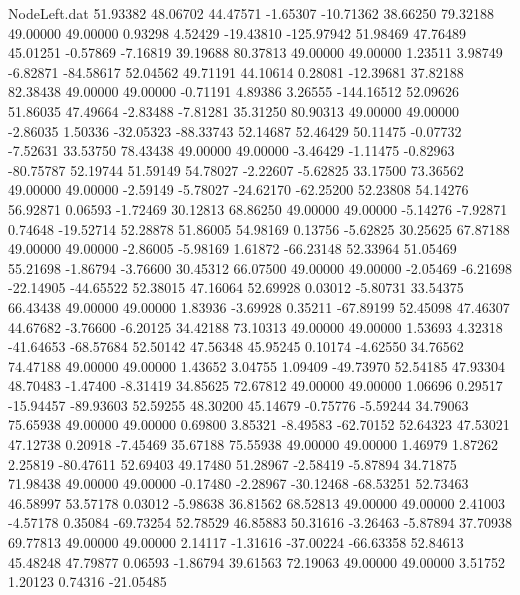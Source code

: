 \begin{filecontents}{NodeLeft.dat}
  51.93382   48.06702   44.47571    -1.65307  -10.71362   38.66250   79.32188   49.00000   49.00000    0.93298    4.52429  -19.43810 -125.97942
  51.98469   47.76489   45.01251    -0.57869   -7.16819   39.19688   80.37813   49.00000   49.00000    1.23511    3.98749   -6.82871  -84.58617
  52.04562   49.71191   44.10614     0.28081  -12.39681   37.82188   82.38438   49.00000   49.00000   -0.71191    4.89386    3.26555 -144.16512
  52.09626   51.86035   47.49664    -2.83488   -7.81281   35.31250   80.90313   49.00000   49.00000   -2.86035    1.50336  -32.05323  -88.33743
  52.14687   52.46429   50.11475    -0.07732   -7.52631   33.53750   78.43438   49.00000   49.00000   -3.46429   -1.11475   -0.82963  -80.75787
  52.19744   51.59149   54.78027    -2.22607   -5.62825   33.17500   73.36562   49.00000   49.00000   -2.59149   -5.78027  -24.62170  -62.25200
  52.23808   54.14276   56.92871     0.06593   -1.72469   30.12813   68.86250   49.00000   49.00000   -5.14276   -7.92871    0.74648  -19.52714
  52.28878   51.86005   54.98169     0.13756   -5.62825   30.25625   67.87188   49.00000   49.00000   -2.86005   -5.98169    1.61872  -66.23148
  52.33964   51.05469   55.21698    -1.86794   -3.76600   30.45312   66.07500   49.00000   49.00000   -2.05469   -6.21698  -22.14905  -44.65522
  52.38015   47.16064   52.69928     0.03012   -5.80731   33.54375   66.43438   49.00000   49.00000    1.83936   -3.69928    0.35211  -67.89199
  52.45098   47.46307   44.67682    -3.76600   -6.20125   34.42188   73.10313   49.00000   49.00000    1.53693    4.32318  -41.64653  -68.57684
  52.50142   47.56348   45.95245     0.10174   -4.62550   34.76562   74.47188   49.00000   49.00000    1.43652    3.04755    1.09409  -49.73970
  52.54185   47.93304   48.70483    -1.47400   -8.31419   34.85625   72.67812   49.00000   49.00000    1.06696    0.29517  -15.94457  -89.93603
  52.59255   48.30200   45.14679    -0.75776   -5.59244   34.79063   75.65938   49.00000   49.00000    0.69800    3.85321   -8.49583  -62.70152
  52.64323   47.53021   47.12738     0.20918   -7.45469   35.67188   75.55938   49.00000   49.00000    1.46979    1.87262    2.25819  -80.47611
  52.69403   49.17480   51.28967    -2.58419   -5.87894   34.71875   71.98438   49.00000   49.00000   -0.17480   -2.28967  -30.12468  -68.53251
  52.73463   46.58997   53.57178     0.03012   -5.98638   36.81562   68.52813   49.00000   49.00000    2.41003   -4.57178    0.35084  -69.73254
  52.78529   46.85883   50.31616    -3.26463   -5.87894   37.70938   69.77813   49.00000   49.00000    2.14117   -1.31616  -37.00224  -66.63358
  52.84613   45.48248   47.79877     0.06593   -1.86794   39.61563   72.19063   49.00000   49.00000    3.51752    1.20123    0.74316  -21.05485

\end{filecontents}
